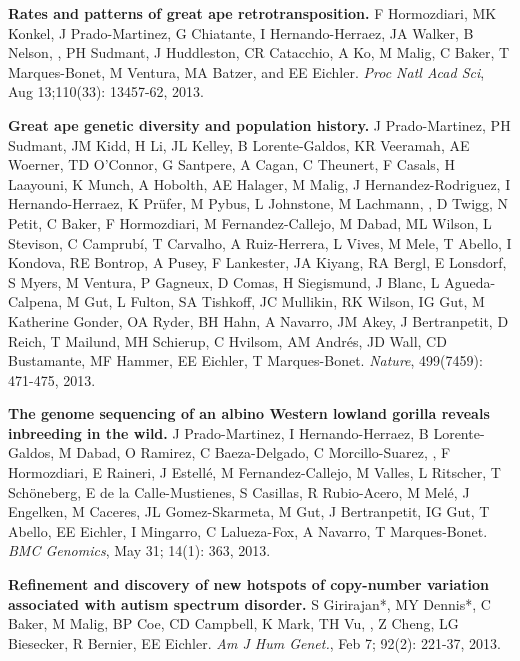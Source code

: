 \vspace{-.2cm}
    {\bf Rates and patterns of great ape retrotransposition.}
    F Hormozdiari, MK Konkel, J Prado-Martinez, G Chiatante, I Hernando-Herraez, JA Walker, B Nelson, \calkan{}, PH Sudmant, J Huddleston, CR Catacchio, A Ko, M Malig, C Baker, T Marques-Bonet, M Ventura, MA Batzer, and EE Eichler.
    {\em Proc Natl Acad Sci}, Aug 13;110(33): 13457-62, 2013.

\clearpage

\vspace{-.2cm}
    {\bf Great ape genetic diversity and population history.}
    J Prado-Martinez, PH Sudmant, JM Kidd, H Li, JL Kelley, B Lorente-Galdos, KR Veeramah, AE Woerner, TD O’Connor, G Santpere, A Cagan, C Theunert, F Casals, H Laayouni, K Munch, A Hobolth, AE Halager, M Malig, J Hernandez-Rodriguez, I Hernando-Herraez, K Prüfer, M Pybus, L Johnstone, M Lachmann, \calkan{}, D Twigg, N Petit, C Baker, F Hormozdiari, M Fernandez-Callejo, M Dabad, ML Wilson, L Stevison, C Camprubí, T Carvalho, A Ruiz-Herrera, L Vives, M Mele, T Abello, I Kondova, RE Bontrop, A Pusey, F Lankester, JA Kiyang, RA Bergl, E Lonsdorf, S Myers, M Ventura, P Gagneux, D Comas, H Siegismund, J Blanc, L Agueda-Calpena, M Gut, L Fulton, SA Tishkoff, JC Mullikin, RK Wilson, IG Gut, M Katherine Gonder, OA Ryder, BH Hahn, A Navarro, JM Akey, J Bertranpetit, D Reich, T Mailund, MH Schierup, C Hvilsom, AM Andrés, JD Wall, CD Bustamante, MF Hammer, EE Eichler, T Marques-Bonet.
    {\em Nature}, 499(7459): 471-475, 2013.
      


\vspace{-.2cm}
    {\bf The genome sequencing of an albino Western lowland gorilla reveals inbreeding in the wild.}
    J Prado-Martinez, I Hernando-Herraez, B Lorente-Galdos, M Dabad, O Ramirez, C Baeza-Delgado, C Morcillo-Suarez, \calkan{}, F Hormozdiari, E Raineri, J Estellé, M Fernandez-Callejo, M Valles, L Ritscher, T Schöneberg, E de la Calle-Mustienes, S Casillas, R Rubio-Acero, M Melé, J Engelken, M Caceres, JL Gomez-Skarmeta, M Gut, J Bertranpetit, IG Gut, T Abello, EE Eichler, I Mingarro, C Lalueza-Fox, A Navarro, T Marques-Bonet.
    {\em BMC Genomics}, May 31; 14(1): 363, 2013.


\vspace{-.2cm}
        {\bf Refinement and discovery of new hotspots of copy-number variation associated with autism spectrum disorder.}
        S Girirajan*, MY Dennis*, C Baker, M Malig, BP Coe, CD Campbell, K Mark, TH Vu,
        \calkan{}, Z Cheng, LG Biesecker, R Bernier, EE Eichler.
        {\em Am J Hum Genet.}, Feb 7; 92(2): 221-37, 2013.

